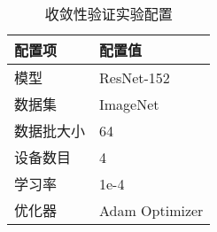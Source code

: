 \begin{table}[h!] %
    \centering
    \caption{收敛性验证实验配置}\label{table:convergence-setup}
    \begin{tabularx}{0.66\linewidth}{ p{3.5cm} X  }
        \toprule 
        \textbf{配置项} & \textbf{配置值}\\
        \midrule 
        模型 & ResNet-152 \\
        数据集 & ImageNet \\
        数据批大小 & 64 \\ 
        设备数目 & 4 \\
        学习率 & 1e-4 \\ 
        优化器 & Adam Optimizer \\
        \bottomrule
    \end{tabularx}
\end{table}
